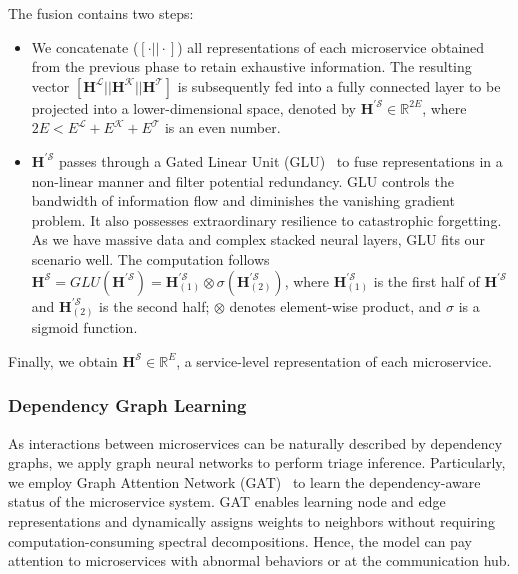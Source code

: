 The fusion contains two steps:
\begin{itemize}[leftmargin=12pt, topsep=3pt]
\setlength\itemsep{0.4em}
\item[A.] We concatenate ($[\cdot || \cdot]$) all representations of each microservice obtained from the previous phase to retain exhaustive information. 
The resulting vector $[\boldsymbol{H}^\mathcal{L} || \boldsymbol{H}^\mathcal{K} || \boldsymbol{H}^\mathcal{T}]$ is subsequently fed into a fully connected layer to be projected into a lower-dimensional space, denoted by $\boldsymbol{H}^{\prime \mathcal{S}} \in \mathbb{R}^{2E}$, where $2E < E^\mathcal{L}+E^\mathcal{K}+E^\mathcal{T}$ is an even number.

\item[B.] $\boldsymbol{H}^{\prime \mathcal{S}}$ passes through a Gated Linear Unit (GLU)~\cite{GLU} to fuse representations in a non-linear manner and filter potential redundancy.
GLU controls the bandwidth of information flow and diminishes the vanishing gradient problem. It also possesses extraordinary resilience to catastrophic forgetting. 
As we have massive data and complex stacked neural layers, GLU fits our scenario well. 
The computation follows $\boldsymbol{H}^\mathcal{S} = GLU(\boldsymbol{H}^{\prime \mathcal{S}}) = \boldsymbol{H}^{\prime \mathcal{S}}_{(1)} \otimes \sigma(\boldsymbol{H}^{\prime \mathcal{S}}_{(2)})$, where $\boldsymbol{H}^{\prime \mathcal{S}}_{(1)}$ is the first half of $\boldsymbol{H}^{\prime \mathcal{S}}$ and $\boldsymbol{H}^{\prime \mathcal{S}}_{(2)}$ is the second half; $\otimes$ denotes element-wise product, and $\sigma$ is a sigmoid function. 
\end{itemize}
Finally, we obtain $\boldsymbol{H}^\mathcal{S} \in \mathbb{R}^{E}$, a service-level representation of each microservice.

\subsubsection{Dependency Graph Learning}\label{sec:method:graph}
As interactions between microservices can be naturally described by dependency graphs, we apply graph neural networks to perform triage inference.
Particularly, we employ Graph Attention Network (GAT)~\cite{GAT-v2} to learn the dependency-aware status of the microservice system.
GAT enables learning node and edge representations and dynamically assigns weights to neighbors without requiring computation-consuming spectral decompositions.
Hence, the model can pay attention to microservices with abnormal behaviors or at the communication hub.

